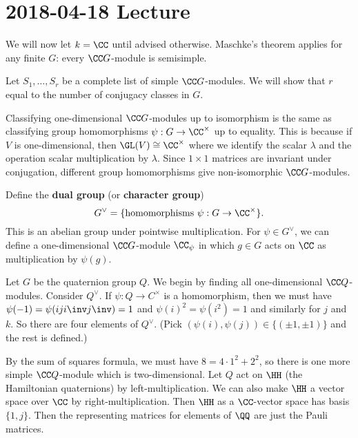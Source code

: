 \section{2018-04-18 Lecture}

\begin{rmk}
	We will now let $k=\CC$ until advised otherwise.
	Maschke's theorem applies for any finite $G$: every $\CC G$-module is semisimple.
\end{rmk}

Let $S_1,\ldots,S_r$ be a complete list of simple $\CC G$-modules.
We will show that $r$ equal to the number of conjugacy classes in $G$.

\begin{rmk}
	Classifying one-dimensional $\CC G$-modules up to isomorphism is the same as classifying group homomorphisms $\psi: G \to \CC^\times$ up to equality.
	This is because if $V$ is one-dimensional, then $\GL(V) \cong \CC^\times$ where we identify the scalar $\lambda$ and the operation scalar multiplication by $\lambda$.
	Since $1 \times 1$ matrices are invariant under conjugation, different group homomorphisms give non-isomorphic $\CC G$-modules.
	
	Define the \textbf{dual group} (or \textbf{character group})
	\[G^\vee = \{\text{homomorphisms } \psi: G \to \CC^\times\}.\]
	This is an abelian group under pointwise multiplication.
	For $\psi \in G^\vee$, we can define a one-dimensional $\CC G$-module $\CC_\psi$ in which $g \in G$ acts on $\CC$ as multiplication by $\psi(g)$.
\end{rmk}

\begin{exam}
	Let $G$ be the quaternion group $Q$.
	We begin by finding all one-dimensional $\CC Q$-modules.
	Consider $Q^\vee$.
	If $\psi: Q \to C^\times$ is a homomorphism, then we must have $\psi(-1) = \psi(iji\inv j\inv) = 1$ and $\psi(i)^2=\psi(i^2)=1$ and similarly for $j$ and $k$.
	So there are four elements of $Q^\vee$.
	(Pick $(\psi(i),\psi(j)) \in \{(\pm 1, \pm 1)\}$ and the rest is defined.)
	
	By the sum of squares formula, we must have $8=4 \cdot 1^2 + 2^2$, so there is one more simple $\CC Q$-module which is two-dimensional.
	Let $Q$ act on $\HH$ (the Hamiltonian quaternions) by left-multiplication.
	We can also make $\HH$ a vector space over $\CC$ by right-multiplication.
	Then $\HH$ as a $\CC$-vector space has basis $\{1,j\}$.
	Then the representing matrices for elements of $\QQ$ are just the Pauli matrices.
\end{exam}

